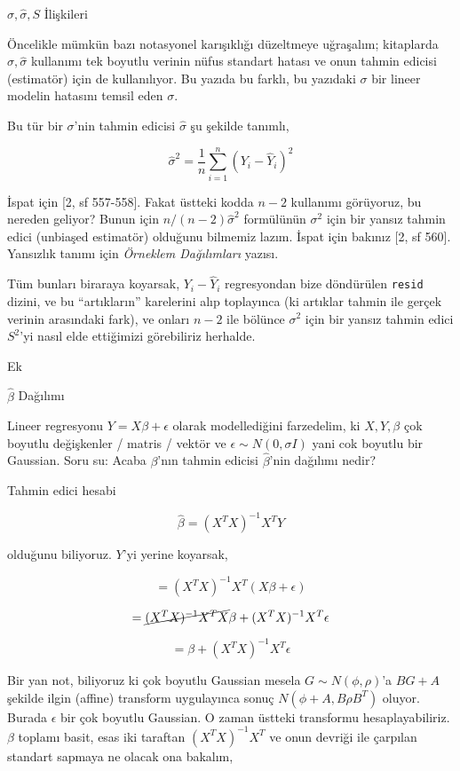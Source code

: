\documentclass[12pt,fleqn]{article}\usepackage{../../common}
\begin{document}
$\sigma,\hat{\sigma},S$ İlişkileri

Öncelikle mümkün bazı notasyonel karışıklığı düzeltmeye uğraşalım;
kitaplarda $\sigma,\hat{\sigma}$ kullanımı tek boyutlu verinin nüfus
standart hatası ve onun tahmin edicisi (estimatör) için de kullanılıyor. Bu
yazıda bu farklı, bu yazıdaki $\sigma$ bir lineer modelin hatasını temsil
eden $\sigma$. 

Bu tür bir $\sigma$'nin tahmin edicisi $\hat{\sigma}$ şu şekilde tanımlı, 

$$ \hat{\sigma}^2 = \frac{1}{n} \sum _{i=1}^{n} (Y_i - \hat{Y}_i)^2 $$

İspat için [2, sf 557-558]. Fakat üstteki kodda $n-2$ kullanımı görüyoruz,
bu nereden geliyor? Bunun için $n/(n-2) \hat{\sigma}^2$ formülünün
$\sigma^2$ için bir yansız tahmin edici (unbiaşed estimatör) olduğunu
bilmemiz lazım. İspat için bakınız [2, sf 560]. Yansızlık tanımı için {\em
  Örneklem Dağılımları} yazısı.

Tüm bunları biraraya koyarsak, $Y_i - \hat{Y}_i$ regresyondan bize
döndürülen \verb!resid! dizini, ve bu ``artıkların'' karelerini alıp
toplayınca (ki artıklar tahmin ile gerçek verinin arasındaki fark), ve
onları $n-2$ ile bölünce $\sigma^2$ için bir yansız tahmin edici $S^2$'yi
nasıl elde ettiğimizi görebiliriz herhalde.

Ek

$\hat{\beta}$ Dağılımı

Lineer regresyonu $Y=X\beta + \epsilon$ olarak modellediğini farzedelim, ki
$X,Y,\beta$ çok boyutlu değişkenler / matris / vektör ve $\epsilon \sim
N(0,\sigma I)$ yani cok boyutlu bir Gaussian.  Soru su: Acaba $\beta$'nın
tahmin edicisi $\hat{\beta}$'nin dağılımı nedir?

Tahmin edici hesabi

$$ \hat{\beta} = (X^TX)^{-1}X^TY $$

olduğunu biliyoruz. $Y$'yi yerine koyarsak,

$$  = (X^TX)^{-1}X^T(X\beta + \epsilon) $$

$$  = \cancel{(X^TX)^{-1}X^TX}\beta + (X^TX)^{-1}X^T\epsilon $$

$$  = \beta + (X^TX)^{-1}X^T\epsilon $$

Bir yan not, biliyoruz ki çok boyutlu Gaussian mesela $G \sim N(\phi,\rho)$'a
$BG + A$ şekilde ilgin (affine) transform uygulayınca sonuç 
$N(\phi+A, B\rho B^T)$ oluyor. Burada $\epsilon$ bir çok boyutlu
Gaussian. O zaman üstteki transformu hesaplayabiliriz. $\beta$ toplamı
basit, esas iki taraftan $(X^TX)^{-1}X^T$ ve onun devriği
ile çarpılan standart sapmaya ne olacak ona bakalım,
\end{document}
